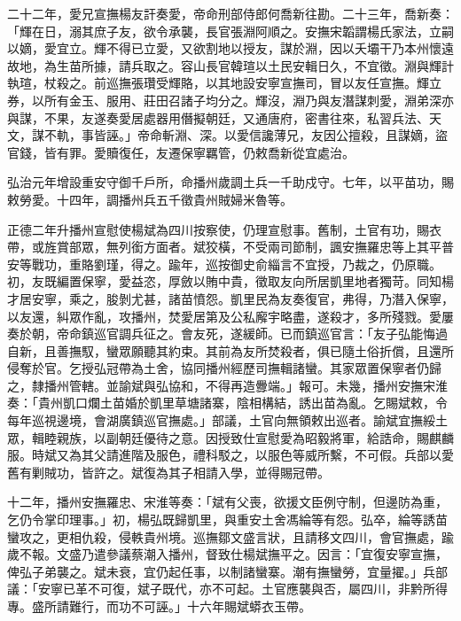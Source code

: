 \begin{pinyinscope}
二十二年，愛兄宣撫楊友訐奏愛，帝命刑部侍郎何喬新往勘。二十三年，喬新奏：「輝在日，溺其庶子友，欲令承襲，長官張淵阿順之。安撫宋韜謂楊氏家法，立嗣以嫡，愛宜立。輝不得已立愛，又欲割地以授友，謀於淵，因以夭壩干乃本州懷遠故地，為生苗所據，請兵取之。容山長官韓瑄以土民安輯日久，不宜徵。淵與輝計執瑄，杖殺之。前巡撫張瓚受輝賂，以其地設安寧宣撫司，冒以友任宣撫。輝立券，以所有金玉、服用、莊田召諸子均分之。輝沒，淵乃與友潛謀刺愛，淵弟深亦與謀，不果，友遂奏愛居處器用僭擬朝廷，又通唐府，密書往來，私習兵法、天文，謀不軌，事皆誣。」帝命斬淵、深。以愛信讒薄兄，友因公擅殺，且謀嫡，盜官錢，皆有罪。愛贖復任，友遷保寧羈管，仍敕喬新從宜處治。

弘治元年增設重安守御千戶所，命播州歲調土兵一千助戍守。七年，以平苗功，賜敕勞愛。十四年，調播州兵五千徵貴州賊婦米魯等。

正德二年升播州宣慰使楊斌為四川按察使，仍理宣慰事。舊制，土官有功，賜衣帶，或旌賞部眾，無列銜方面者。斌狡橫，不受兩司節制，諷安撫羅忠等上其平普安等戰功，重賂劉瑾，得之。踰年，巡按御史俞緇言不宜授，乃裁之，仍原職。初，友既編置保寧，愛益恣，厚斂以賄中貴，徵取友向所居凱里地者獨苛。同知楊才居安寧，乘之，朘剝尤甚，諸苗憤怨。凱里民為友奏復官，弗得，乃潛入保寧，以友還，糾眾作亂，攻播州，焚愛居第及公私廨宇略盡，遂殺才，多所殘戮。愛屢奏於朝，帝命鎮巡官調兵征之。會友死，遂緩師。已而鎮巡官言：「友子弘能悔過自新，且善撫馭，蠻眾願聽其約束。其前為友所焚殺者，俱已隨土俗折償，且還所侵奪於官。乞授弘冠帶為土舍，協同播州經歷司撫輯諸蠻。其家眾置保寧者仍歸之，隸播州管轄。並諭斌與弘協和，不得再造釁端。」報可。未幾，播州安撫宋淮奏：「貴州凱口爛土苗婚於凱里草塘諸寨，陰相構結，誘出苗為亂。乞賜斌敕，令每年巡視邊境，會湖廣鎮巡官撫處。」部議，土官向無領敕出巡者。諭斌宜撫綏土眾，輯睦親族，以副朝廷優待之意。因授致仕宣慰愛為昭毅將軍，給誥命，賜麒麟服。時斌又為其父請進階及服色，禮科駁之，以服色等威所繫，不可假。兵部以愛舊有剿賊功，皆許之。斌復為其子相請入學，並得賜冠帶。

十二年，播州安撫羅忠、宋淮等奏：「斌有父喪，欲援文臣例守制，但邊防為重，乞仍令掌印理事。」初，楊弘既歸凱里，與重安土舍馮綸等有怨。弘卒，綸等誘苗蠻攻之，更相仇殺，侵軼貴州境。巡撫鄒文盛言狀，且請移文四川，會官撫處，踰歲不報。文盛乃遣參議蔡潮入播州，督致仕楊斌撫平之。因言：「宜復安寧宣撫，俾弘子弟襲之。斌未衰，宜仍起任事，以制諸蠻寨。潮有撫蠻勞，宜量擢。」兵部議：「安寧已革不可復，斌子既代，亦不可起。土官應襲與否，屬四川，非黔所得專。盛所請難行，而功不可誣。」十六年賜斌蟒衣玉帶。


\end{pinyinscope}
